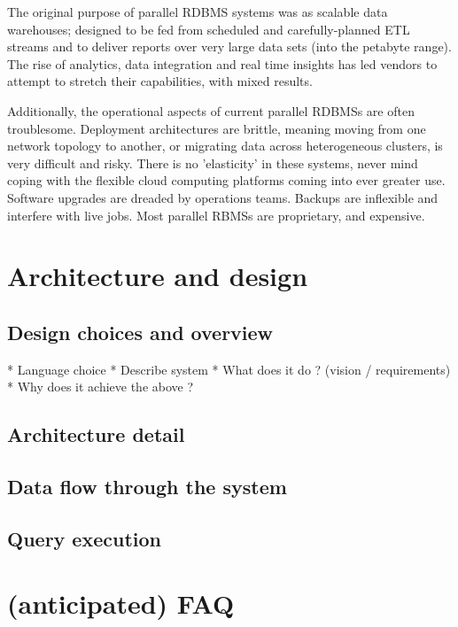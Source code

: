 \documentclass[12pt]{article}
\begin{document}
The original purpose of parallel RDBMS systems was as scalable data warehouses; designed to be fed from scheduled and carefully-planned
ETL streams and to deliver reports over very large data sets (into the petabyte range). The rise of analytics, data integration and real time 
insights has led vendors to attempt to stretch their capabilities, with mixed results. 

Additionally, the operational aspects of current parallel RDBMSs are often troublesome. Deployment architectures are brittle, meaning moving from 
one network topology to another, or migrating data across heterogeneous clusters, is very difficult and risky. There is no 'elasticity' in these systems,
never mind coping with the flexible cloud computing platforms coming into ever greater use. Software upgrades are dreaded by operations teams. Backups
are inflexible and interfere with live jobs. 
Most parallel RBMSs are proprietary, and expensive. 

\section{Architecture and design}

\subsection{Design choices and overview}
* Language choice
* Describe system
* What does it do ? (vision / requirements)
* Why does it achieve the above ?

\subsection{Architecture detail}
\subsection{Data flow through the system}
\subsection{Query execution}
\subsection{}

\section{(anticipated) FAQ}
\end{document}
